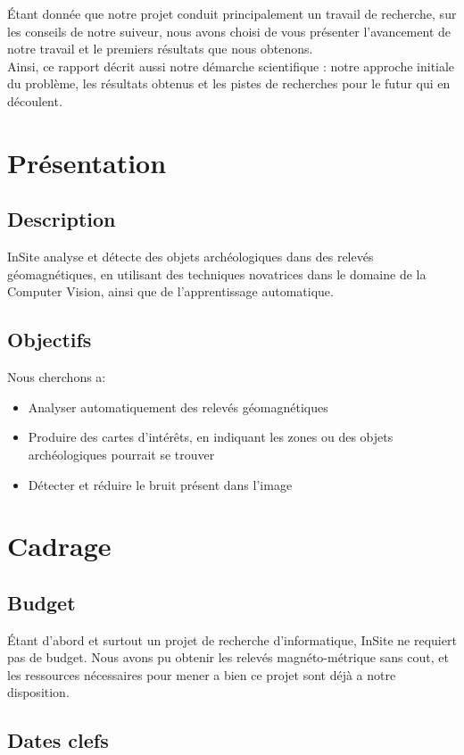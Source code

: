 \documentclass[a4paper, 12pt, titlepage, oneside, french]{article}
\begin{document}
	Étant donnée que notre projet conduit principalement un travail de recherche, sur les conseils de notre suiveur, nous avons choisi de vous présenter l'avancement de notre travail et le premiers résultats que nous obtenons. \\
	Ainsi, ce rapport décrit aussi notre démarche scientifique : notre approche initiale du problème, les résultats obtenus et les pistes de recherches pour le futur qui en découlent.
	
	\newpage
\section{Présentation}
	\subsection{Description}
		InSite analyse et détecte des objets archéologiques dans des relevés géomagnétiques, en utilisant des techniques novatrices dans le domaine de
		la Computer Vision, ainsi que de l'apprentissage automatique.
	\subsection{Objectifs}
	Nous cherchons a:
	\begin{itemize}
		\item Analyser automatiquement des relevés géomagnétiques 
		\item Produire des cartes d'intérêts, en indiquant les zones ou des objets archéologiques pourrait se trouver
		\item Détecter et réduire le bruit présent dans l'image
	\end{itemize}

	\newpage

\section{Cadrage}
	\subsection{Budget}
	Étant d'abord et surtout un projet de recherche d'informatique, InSite ne requiert pas de budget. Nous avons pu obtenir les relevés magnéto-métrique sans cout, et les ressources nécessaires pour mener a bien ce projet sont déjà a notre disposition. 
	\subsection{Dates clefs}
\end{document}
